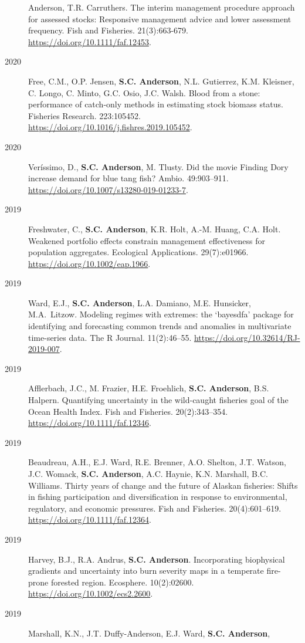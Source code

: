 \begin{description}
{Anderson}, T.R. Carruthers. The interim management procedure approach
for assessed stocks: Responsive management advice and lower assessment
frequency. Fish and Fisheries. 21(3):663-679.
\url{https://doi.org/10.1111/faf.12453}.
\item[2020]
Free, C.M., O.P. Jensen, \textbf{S.C. Anderson}, N.L. Gutierrez, K.M.
Kleisner, C. Longo, C. Minto, G.C. Osio, J.C. Walsh. Blood from a stone:
performance of catch-only methods in estimating stock biomass status.
Fisheries Research. 223:105452.
\url{https://doi.org/10.1016/j.fishres.2019.105452}.
\item[2020]
Veríssimo, D., \textbf{S.C. Anderson}, M. Tlusty. Did the movie Finding
Dory increase demand for blue tang fish? Ambio. 49:903--911.
\url{https://doi.org/10.1007/s13280-019-01233-7}.
\item[2019]
Freshwater, C., \textbf{S.C. Anderson}, K.R. Holt, A.-M. Huang, C.A.
Holt. Weakened portfolio effects constrain management effectiveness for
population aggregates. Ecological Applications. 29(7):e01966.
\url{https://doi.org/10.1002/eap.1966}.
\item[2019]
Ward, E.J., \textbf{S.C. Anderson}, L.A. Damiano, M.E. Hunsicker,
M.A.\ Litzow. Modeling regimes with extremes: the `bayesdfa' package for
identifying and forecasting common trends and anomalies in multivariate
time-series data. The R Journal. 11(2):46--55.
\url{https://doi.org/10.32614/RJ-2019-007}.
\item[2019]
Afflerbach, J.C., M. Frazier, H.E. Froehlich, \textbf{S.C. Anderson},
B.S. Halpern. Quantifying uncertainty in the wild-caught fisheries goal
of the Ocean Health Index. Fish and Fisheries. 20(2):343--354.
\url{https://doi.org/10.1111/faf.12346}.
\item[2019]
Beaudreau, A.H., E.J. Ward, R.E. Brenner, A.O. Shelton, J.T. Watson,
J.C. Womack, \textbf{S.C. Anderson}, A.C. Haynie, K.N. Marshall, B.C.
Williams. Thirty years of change and the future of Alaskan fisheries:
Shifts in fishing participation and diversification in response to
environmental, regulatory, and economic pressures. Fish and Fisheries.
20(4):601--619. \url{https://doi.org/10.1111/faf.12364}.
\item[2019]
Harvey, B.J., R.A. Andrus, \textbf{S.C. Anderson}. Incorporating
biophysical gradients and uncertainty into burn severity maps in a
temperate fire-prone forested region. Ecosphere. 10(2):02600.
\url{https://doi.org/10.1002/ecs2.2600}.
\item[2019]
Marshall, K.N., J.T. Duffy-Anderson, E.J. Ward, \textbf{S.C. Anderson},

\end{description}
